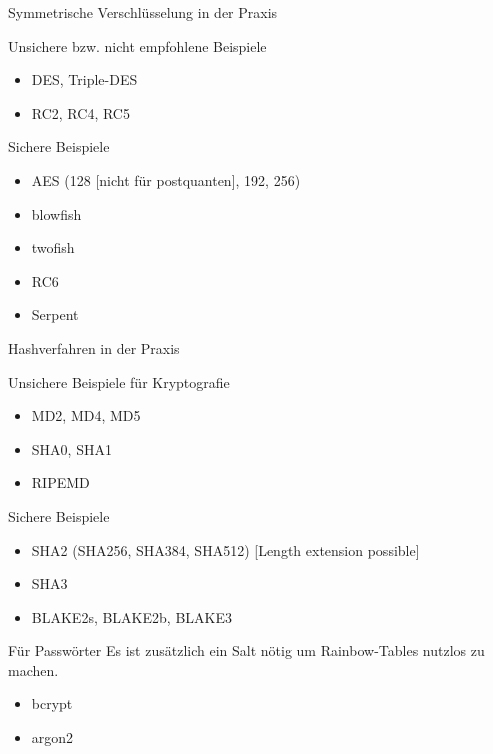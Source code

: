 \documentclass[10pt]{beamer}
\begin{document}
	\begin{frame}{Symmetrische Verschlüsselung in der Praxis}
		\begin{alertblock}{Unsichere bzw. nicht empfohlene Beispiele}
			\begin{itemize}
				\color{red}
				\item DES, Triple-DES
				\item RC2, RC4, RC5
			\end{itemize}
		\end{alertblock}
		\begin{alertblock}{Sichere Beispiele}
			\begin{itemize}
				\color{darkgreen}
				\item AES (128 [nicht für postquanten], 192, 256)
				\item blowfish
				\item twofish
				\item RC6
				\item Serpent
			\end{itemize}
		\end{alertblock}
	\end{frame}
	
	\begin{frame}{Hashverfahren in der Praxis}
		\begin{alertblock}{Unsichere Beispiele für Kryptografie}
			\begin{itemize}
				\color{red}
				\item MD2, MD4, MD5
				\item SHA0, SHA1
				\item RIPEMD
			\end{itemize}
		\end{alertblock}
		\begin{alertblock}{Sichere Beispiele}
			\begin{itemize}
				\color{darkgreen}
				\item SHA2 (SHA256, SHA384, SHA512) [Length extension possible]
				\item SHA3
				\item BLAKE2s, BLAKE2b, BLAKE3
			\end{itemize}
		\end{alertblock}
		\begin{alertblock}{Für Passwörter}
			\vspace{0.1cm}
			Es ist zusätzlich ein Salt nötig um Rainbow-Tables nutzlos zu machen.
			\vspace{-0.2cm}
			
		\begin{itemize}
			\color{darkgreen}
			\item bcrypt
			\item argon2
		\end{itemize}
	\end{alertblock}
	\end{frame}
	
\end{document}
